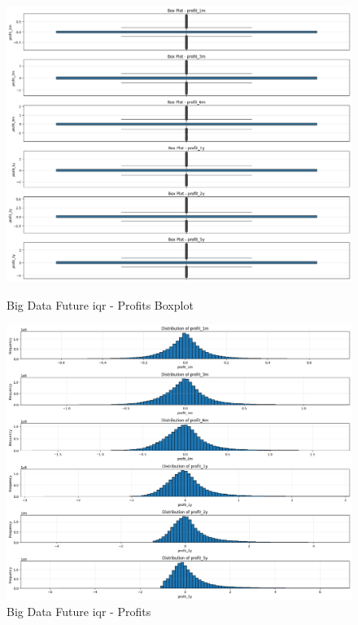 \documentclass[11pt,english,a4paper,hidelinks]{book}
\begin{document}
\begin{figure}[H]
    \centering
    \begin{minipage}{0.5\textwidth}
        \centering
        \includegraphics[width=1\linewidth]{images/code/descriptive analysis/distributions/Big Data future IQR - Profits Boxplot.png}
        \caption{Big Data Future \acrshort{iqr} - Profits Boxplot}
        \label{fig:big_data_future_iqr_profits_boxplot}
    \end{minipage}\hfill
    \begin{minipage}{0.5\textwidth}
        \centering
        \includegraphics[width=1\linewidth]{images/code/descriptive analysis/distributions/Big Data Future IQR - Profits.png}
        \caption{Big Data Future \acrshort{iqr} - Profits}
        \label{fig:big_data_future_iqr_profits_iqr}
    \end{minipage}
\end{figure}
\end{document}
